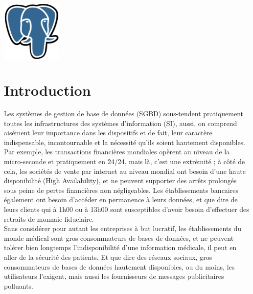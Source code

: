 \documentclass[12pt]{report}
\begin{document}
\begin{titlepage}
\begin{center}
           \vspace{3cm}

           \includegraphics [width=30mm]{./postgresql.png}

  \end{center}

\end{titlepage}


\tableofcontents
\newpage

\chapter*{Introduction}

Les systèmes de gestion de base de données (SGBD) sous-tendent pratiquement
toutes les infrastructures des systèmes d'information (SI), aussi, on comprend
aisément leur importance dans les dispositifs et de fait, leur caractère
indispensable, incontournable et la nécessité qu'ils soient hautement
disponibles. Par exemple, les transactions financières mondiales opèrent au
niveau de la micro-seconde et pratiquement en 24/24, mais là, c'est une
extrémité ; à côté de cela, les sociétés de vente par internet au niveau mondial
ont besoin d'une haute disponibilité (High Availability), et ne peuvent
supporter des arrêts prolongés sous peine de pertes financières non
négligeables. Les établissements bancaires également ont besoin d'accéder en
permanence à leurs données, et que dire de leurs clients qui à 1h00 ou à 13h00
sont susceptibles d'avoir besoin d'effectuer des retraits de monnaie
fiduciaire. \\

Sans considérer pour autant les entreprises à but lucratif, les établissements
du monde médical sont gros consommateurs de bases de données, et ne peuvent
tolérer bien longtemps l'indisponibilité d'une information médicale, il peut en
aller de la sécurité des patients. Et que dire des réseaux sociaux, gros
consommateurs de bases de données hautement disponibles, ou du moins, les
utilisateurs l'exigent, mais aussi les fournisseurs de messages publicitaires
polluants.\\
\end{document}
